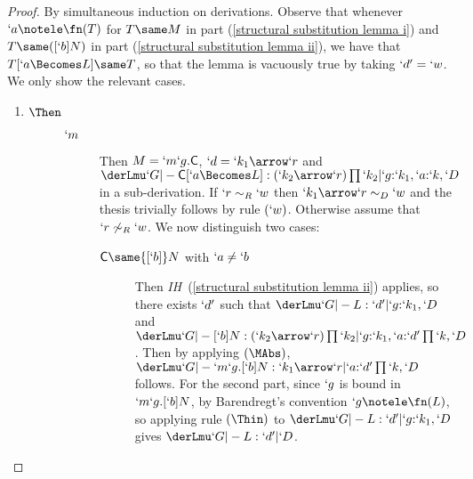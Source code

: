 \documentclass{CSML}
\begin{document}
 \begin{proof} 
By simultaneous induction on derivations. 
Observe that whenever $`a \notele \fn(T)$ for $T\same M$ in part (\ref{structural substitution lemma i}) and $T\same ([`b]N)$ in part (\ref{structural substitution lemma ii}), we have that $T[`a\Becomes L] \same T$, so that the lemma is vacuously true by taking $`d' = `w$. 
We only show the relevant cases.

 \begin{enumerate} %

 \item %

 \begin{description} 
 \item [$\Then$]

 \begin{description} 

 \item [$`m$]
Then $M = `m `g.\textrm{\sf C}$, $`d = `k_1\arrow `r$ and $ \derLmu `G |- {\Cmd[`a\Becomes L]} : {(`k_2\arrow `r)\prod`k_2} | `g{:}`k_1, `a{:}`k,`D $ in a sub-derivation.
If $`r \sim_R `w$ then $`k_1\arrow `r \sim_D `w$ and the thesis trivially 
follows by rule $(`w)$. Otherwise assume that $`r \not\sim_R `w$.
We now distinguish two cases:

 \begin{description}

 \item [{$ \Cmd \same {[`b]}N $ with $`a \not= `b$}] 
Then \emph{IH}~(\ref{structural substitution lemma ii}) applies, so there exists $`d'$ such that $\derLmu `G |- L : `d' | `g{:}`k_1,`D $ and $\derLmu `G |- [`b]N : (`k_2\arrow `r)\prod`k_2 | `g{:}`k_1,`a{:}`d'\prod`k,`D $.
Then by applying $(\MAbs)$, $\derLmu `G |- `m `g.[`b]N : `k_1\arrow `r | `a{:}`d'\prod`k,`D $ follows. 
For the second part, since $`g$ is bound in $`m `g.{[`b]}N$, by Barendregt's convention $`g\notele \fn(L)$, so applying rule $(\Thin)$ to $\derLmu `G |- L : `d' | `g{:}`k_1,`D $ gives $ \derLmu `G |- L : `d' | `D $.


\end{description}
\end{description}
\end{description}
\end{enumerate}
\end{proof}
\end{document}
